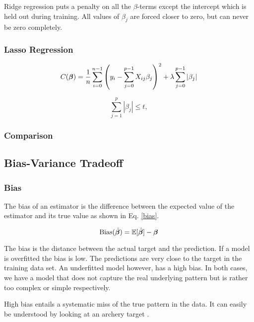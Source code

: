 Ridge regression puts a penalty on all the $\beta$-terms except the intercept which is held out during training. All values of $\beta_j$ are forced closer to zero, but can never be zero completely. 

\subsubsection{Lasso Regression}

\begin{equation}
     C(\boldsymbol{\beta}) = \frac{1}{n} \sum_{i=0}^{n-1} \left( y_i - \sum_{j=0}^{p-1} X_{ij}\beta_j \right)^2 + \lambda\sum_{j=0}^{p-1} |\beta_j|
\end{equation}

\begin{equation}
    \sum_{j=1}^p | \beta_j | \leq t, 
\end{equation}

\subsubsection{Comparison}




\subsection{Bias-Variance Tradeoff}


\subsubsection{Bias}
The bias of an estimator is the difference between the expected value of the estimator and its true value as shown in Eq. \ref{bias}. 

\begin{equation}\label{bias}
    \text{Bias}(\hat{\boldsymbol{\beta}}) = \mathbb{E}[\hat{\boldsymbol{\beta}}]-\boldsymbol{\beta}
\end{equation}

The bias is the distance between the actual target and the prediction. If a model is overfitted the bias is low. The predictions are very close to the target in the training data set. An underfitted model however, has a high bias. In both cases, we have a model that does not capture the real underlying pattern but is rather too complex or simple respectively. 

High bias entails a systematic miss of the true pattern in the data. It can easily be understood by looking at an archery target . 

